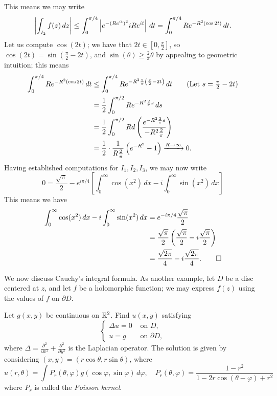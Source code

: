 \begin{solution}
    This means we may write
    \[ \left\lvert \int_{I_2} f(z) \, dz \right\rvert \leq \int_0^{\pi/4} \left\lvert e^{-(Re^{it})^2} i Re^{it} \right\rvert \, dt = \int_0^{\pi/4} Re^{-R^2(\cos 2t)} \, dt. \]
    Let us compute $\cos(2t)$; we have that $2t \in [0, \frac{\pi}{2}]$, so $\cos(2t) = \sin(\frac{\pi}{2} - 2t)$, and $\sin(\theta) \geq \frac{2}{\pi} \theta$ by appealing to geometric intuition; this means
    \begin{align*}
        \int_0^{\pi/4} Re^{-R^2(\cos 2t)} \, dt &\leq \int_0^{\pi/4} Re^{-R^2 \frac{2}{\pi} \left(\frac{\pi}{2}  - 2t\right)} \, dt \tag{Let $s = \frac{\pi}{2} - 2t$}\\
        &= \frac{1}{2} \int_0^{\pi/2} Re^{-R^2 \frac{2}{\pi} s} \, ds \\
        &= \frac{1}{2} \int_0^{\pi/2} R d\left(\frac{e^{-R^2 \frac{2}{\pi} s}}{-R^2 \frac{2}{\pi}}\right) \\
        &= \frac{1}{2} \cdot \frac{1}{R \frac{2}{\pi}} \left(e^{-R^2} - 1\right) \taking{R \to \infty} 0.
    \end{align*}
    Having established computations for $I_1, I_2, I_3$, we may now write
    \[ 0 = \frac{\sqrt{\pi}}{2} - e^{i \pi/4} \left[\int_0^\infty \cos(x^2) \, dx - i \int_0^\infty \sin(x^2) \, dx \right] \]
    This means we have
    \begin{align*}
        \int_0^\infty \cos(x^2) \, dx - i \int_0^\infty \sin(x^2) \, dx &= e^{-i \pi/4} \frac{\sqrt{\pi}}{2} \\
        &= \frac{\sqrt{\pi}}{2} \left(\frac{\sqrt{\pi}}{2} - i \frac{\sqrt{\pi}}{2}\right) \\
        &= \frac{\sqrt{2\pi}}{4} - i \frac{\sqrt{2\pi}}{4}. \qedhere
    \end{align*}
\end{solution}
\noindent We now discuss Cauchy's integral formula. As another example, let $D$ be a disc centered at $z$, and let $f$ be a holomorphic function; we may express $f(z)$ using the values of $f$ on $\partial D$.
\begin{example}
    Let $g(x, y)$ be continuous on $\mathbb R^2$. Find $u(x, y)$ satisfying
    \[ \begin{cases} \Delta u = 0 & \text{ on } D, \\ u = g & \text{ on } \partial D, \end{cases} \]
    where $\Delta = \frac{\partial^2}{\partial x^2} + \frac{\partial^2}{\partial y^2}$ is the Laplacian operator. The solution is given by considering $(x, y) = (r \cos \theta, r \sin \theta)$, where
    \[ u(r, \theta) = \int P_r(\theta, \varphi) g(\cos \varphi, \sin \varphi) \, d\varphi, \quad P_r(\theta, \varphi) = \frac{1 - r^2}{1 - 2 r \cos(\theta - \varphi) + r^2} \]
    where $P_r$ is called the \textit{Poisson kernel}.
\end{example}
